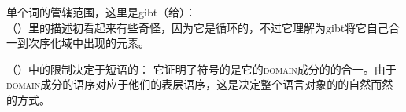 \ea
单个词的管辖范围，这里是gibt（给）：\\
 
\z
（）里的描述初看起来有些奇怪，因为它是循环的，不过它理解为gibt将它自己合一到次序化域中出现的元素。

（）中的限制决定于短语的\phonvsc ：
\ea
{} \impl
{}
\z
它证明了符号的\phonvc 是它的\textsc{domain}成分的\phonvsc 的合一。由于\textsc{domain}成分的语序对应于他们的表层语序，这是决定整个语言对象的\phonvc 的自然而然的方式。

